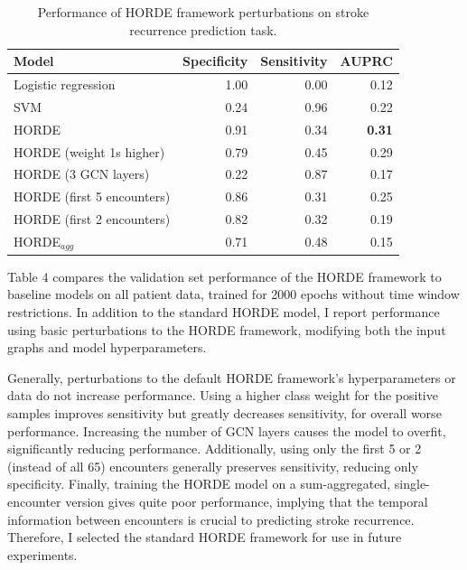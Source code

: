 \documentclass{article}
\begin{document}
\begin{table}
    \caption{
      Performance of HORDE framework perturbations on stroke recurrence prediction task.
    }
    \label{tab:exp}
    \centering
    \centering
    \label{tab:exp-synth}
    \begin{small}
    \begin{sc}
    \begin{tabular}{lrrr}
    \toprule
    Model                         & Specificity & Sensitivity & AUPRC \\
    \midrule
    Logistic regression                                & 1.00 & 0.00 & 0.12 \\
    SVM                                    & 0.24 & 0.96 & 0.22     \\
    HORDE                                  & 0.91 & 0.34 & \textbf{0.31}   \\
    HORDE (weight 1s higher)               & 0.79 & 0.45 & 0.29   \\
    HORDE (3 GCN layers)                   & 0.22 & 0.87 & 0.17   \\
    HORDE (first 5 encounters)             & 0.86 & 0.31 & 0.25   \\
    HORDE (first 2 encounters)             & 0.82 & 0.32 & 0.19   \\
    HORDE$_{agg}$                            & 0.71 & 0.48 & 0.15   \\
    \bottomrule
    \end{tabular}
    \end{sc}
    \end{small}

\end{table}

Table 4 compares the validation set performance of the HORDE framework to baseline models on all patient data, trained for 2000 epochs without time window restrictions. In addition to the standard HORDE model, I report performance using basic perturbations to the HORDE framework, modifying both the input graphs and model hyperparameters.

Generally, perturbations to the default HORDE framework's hyperparameters or data do not increase performance. Using a higher class weight for the positive samples improves sensitivity but greatly decreases sensitivity, for overall worse performance. Increasing the number of GCN layers causes the model to overfit, significantly reducing performance. Additionally, using only the first 5 or 2 (instead of all 65) encounters generally preserves sensitivity, reducing only specificity. Finally, training the HORDE model on a sum-aggregated, single-encounter version gives quite poor performance, implying that the temporal information between encounters is crucial to predicting stroke recurrence. Therefore, I selected the standard HORDE framework for use in future experiments.
\end{document}
